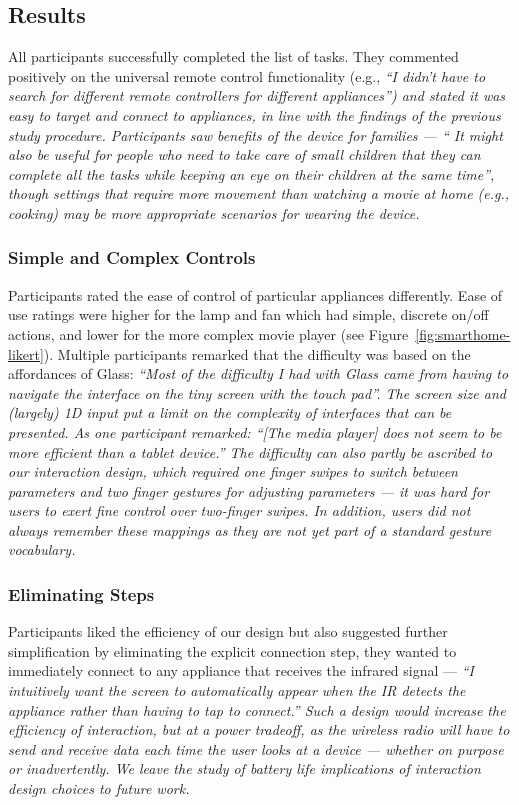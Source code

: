 \documentclass{sigchi}
\newcommand {\studyquote}[1]{\em ``#1''\normalfont}
\begin{document}
\subsection{Results}
All participants successfully completed the list of tasks. They commented positively on the universal remote control functionality (e.g., \studyquote{I didn't have to search for different remote controllers for different appliances}) and stated it was easy to target and connect to appliances, in line with the findings of the previous study procedure. Participants saw benefits of the device for families --- \studyquote{ It might also be useful for people who need to take care of small children that they can complete all the tasks while keeping an eye on their children at the same time}, though settings that require more movement than watching a movie at home (e.g., cooking) may be more appropriate scenarios for wearing the device. 

\subsubsection{Simple and Complex Controls}
Participants rated the ease of control of particular appliances differently. Ease of use ratings were higher for the lamp and fan which had simple, discrete on/off actions, and lower for the more complex movie player (see Figure~\ref{fig:smarthome-likert}). Multiple participants remarked that the difficulty was based on the affordances of Glass: \studyquote{Most of the difficulty I had with Glass came from having to navigate the interface on the tiny screen with the touch pad}. The screen size and (largely) 1D input put a limit on the complexity of interfaces that can be presented. As one participant remarked: \studyquote{[The media player] does not seem to be more efficient than a tablet device.} The difficulty can also partly be ascribed to our interaction design, which required one finger swipes to switch between parameters and two finger gestures for adjusting parameters --- it was hard for users to exert fine control over two-finger swipes. In addition, users did not always remember these mappings as they are not yet part of a standard gesture vocabulary.

\subsubsection{Eliminating Steps}
Participants liked the efficiency of our design but also suggested further simplification by eliminating the explicit connection step, they wanted to immediately connect to any appliance that receives the infrared signal --- \studyquote{I intuitively want the screen to automatically appear when the IR detects the appliance rather than having to tap to connect.} Such a design would increase the efficiency of interaction, but at a power tradeoff, as the wireless radio will have to send and receive data each time the user looks at a device --- whether on purpose or inadvertently. We leave the study of battery life implications of interaction design choices to future work. 
\end{document}
